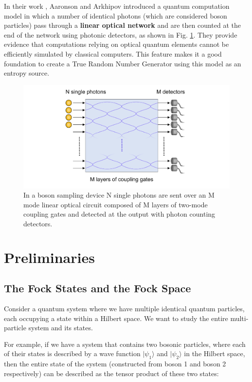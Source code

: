In their work \cite{boson}, Aaronson and Arkhipov introduced a quantum computation model in which a number of identical photons (which are considered boson particles) pass through a \textbf{linear optical network} and are then counted at the end of the network using photonic detectors, as shown in Fig. \ref{fig:bosonsample}. They provide evidence that computations relying on optical quantum elements cannot be efficiently simulated by classical computers. This feature makes it a good foundation to create a True Random Number Generator using this model as an entropy source.

\begin{figure}
\centering
\includegraphics[width=16cm]{figures/1712.10037v3.png}\vspace{-0.2cm}
\caption{In a boson sampling device N single photons are sent over an M mode linear optical circuit composed of M layers of two-mode coupling gates and detected at the output with photon counting detectors. \cite{dede}}
\label{fig:bosonsample}
\end{figure}

\section{Preliminaries}
\subsection{The Fock States and the Fock Space}
Consider a quantum system where we have multiple identical quantum particles, each occupying a state within a Hilbert space. We want to study the entire multi-particle system and its states.

For example, if we have a system that contains two bosonic particles, where each of their states is described by a wave function \( |\psi_1\rangle \) and \( |\psi_2\rangle \) in the Hilbert space, then the entire state of the system (constructed from boson 1 and boson 2 respectively) can be described as the tensor product of these two states:

